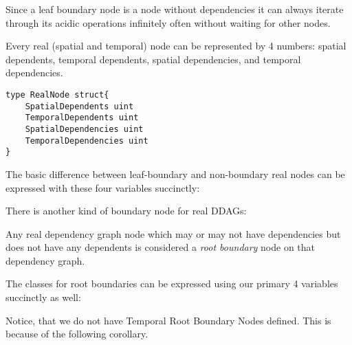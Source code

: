 \begin{con-lem}[]
	\label{leaf-boundaries-infinite}
	Since a leaf boundary node is a node without dependencies it can always iterate through its acidic operations infinitely often without waiting for other nodes.
\end{con-lem}


Every real (spatial and temporal) node can be represented by 4 numbers: spatial dependents, temporal dependents, spatial dependencies, and temporal dependencies.

\begin{verbatim}
type RealNode struct{
	SpatialDependents uint
	TemporalDependents uint
	SpatialDependencies uint
	TemporalDependencies uint
}
\end{verbatim}

The basic difference between leaf-boundary and non-boundary real nodes can be expressed with these four variables succinctly:

\noindent{}

There is another kind of boundary node for real DDAGs:

\begin{con-def}
	\label{root-boundaries}
	Any real dependency graph node which may or may not have dependencies but does not have any dependents is considered a \textit{root boundary} node on that dependency graph.
\end{con-def}

The classes for root boundaries can be expressed using our primary 4 variables succinctly as well:

\noindent{}


Notice, that we do not have Temporal Root Boundary Nodes defined. This is because of the following corollary.

